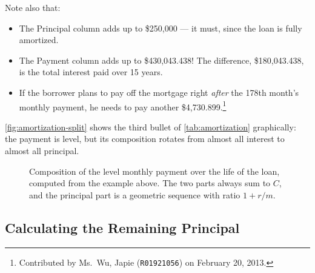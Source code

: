 Note also that:

\begin{itemize}[nosep]
	\item The \textsf{Principal} column adds up to \$250,000 --- it must, since the loan is fully amortized.
	\item The \textsf{Payment} column adds up to \$430,043.438!
	      The difference, \$180,043.438, is the total interest paid over 15 years.
	\item If the borrower plans to pay off the mortgage right \emph{after} the 178th month's monthly payment, he needs to pay another \$4,730.899.\footnote{Contributed by Ms.~Wu, Japie (\texttt{R01921056}) on February 20, 2013.}
\end{itemize}

\suppstart
\autoref{fig:amortization-split} shows the third bullet of \autoref{tab:amortization} graphically: the payment is level, but its composition rotates from almost all interest to almost all principal.

\begin{figure}[H]
	\centering
	\caption{Composition of the level monthly payment over the life of the
		loan, computed from the example above. The two parts always sum to $C$,
		and the principal part is a geometric sequence with ratio $1+r/m$.}
	\label{fig:amortization-split}
\end{figure}
\suppend

\subsection{Calculating the Remaining Principal}

